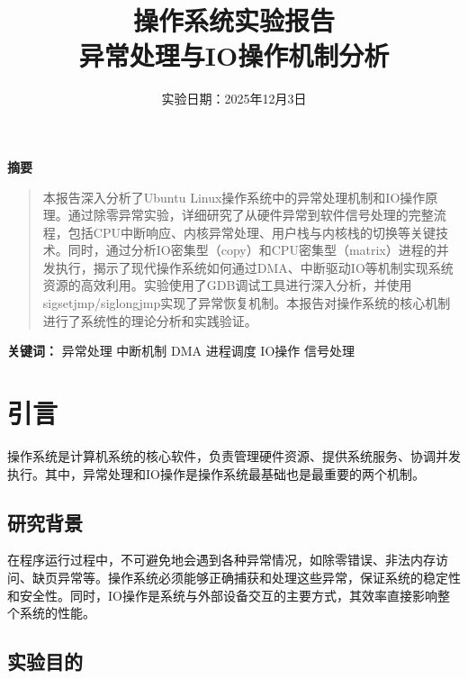 \documentclass[UTF8,a4paper,12pt]{ctexart}
\title{\textbf{\Huge 操作系统实验报告} \\
\vspace{0.5cm}
\Large 异常处理与IO操作机制分析}
\author{实验日期：2025年12月3日}
\date{}
\begin{document}
\maketitle
\thispagestyle{empty}

\vspace{2cm}

\begin{center}
\Large
\textbf{摘要}
\end{center}

\begin{quote}
本报告深入分析了Ubuntu Linux操作系统中的异常处理机制和IO操作原理。通过除零异常实验，详细研究了从硬件异常到软件信号处理的完整流程，包括CPU中断响应、内核异常处理、用户栈与内核栈的切换等关键技术。同时，通过分析IO密集型（copy）和CPU密集型（matrix）进程的并发执行，揭示了现代操作系统如何通过DMA、中断驱动IO等机制实现系统资源的高效利用。实验使用了GDB调试工具进行深入分析，并使用sigsetjmp/siglongjmp实现了异常恢复机制。本报告对操作系统的核心机制进行了系统性的理论分析和实践验证。
\end{quote}

\vspace{1cm}

\begin{center}
\textbf{关键词：} 异常处理 \quad 中断机制 \quad DMA \quad 进程调度 \quad IO操作 \quad 信号处理
\end{center}

\newpage

\tableofcontents

\newpage

\section{引言}

操作系统是计算机系统的核心软件，负责管理硬件资源、提供系统服务、协调并发执行。其中，异常处理和IO操作是操作系统最基础也是最重要的两个机制。

\subsection{研究背景}

在程序运行过程中，不可避免地会遇到各种异常情况，如除零错误、非法内存访问、缺页异常等。操作系统必须能够正确捕获和处理这些异常，保证系统的稳定性和安全性。同时，IO操作是系统与外部设备交互的主要方式，其效率直接影响整个系统的性能。

\subsection{实验目的}
\end{document}
